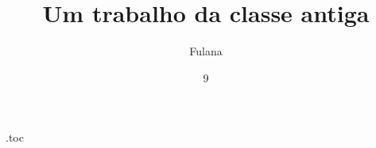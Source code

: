 \begin{filecontents*}[overwrite]{\jobname.toc}
%
\end{filecontents*}
\documentclass[dsc]{coppe}
\renewcommand\coppefinalmanual{\emph{Norma Antiga de Teste}}

\title{Um trabalho da classe antiga}
\author{Fulana}{de Tal}
\date{9}{2026}
\maketitle
\frontmatter
\begin{abstract}
Texto do resumo.
\end{abstract}
\tableofcontents
\listofmapas
\mainmatter
\chapter{Introdução}
Texto.
\begin{mapa}[h]
  \caption{Um mapa}
  \centering Mapa.
\end{mapa}
\coppetexfinalpage

